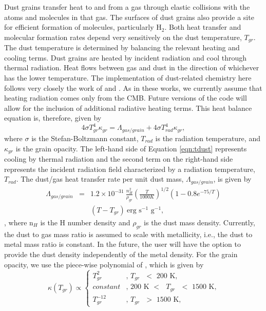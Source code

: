 Dust grains transfer heat to and from a gas through elastic collisions
with the atoms and molecules in that gas.  The surfaces of dust grains
also provide a site for efficient formation of molecules, particularly
H$_{2}$.  Both heat transfer and molecular formation rates depend very
sensitively on the dust temperature, $T_{gr}$.  The dust temperature
is determined by balancing the relevant heating and cooling terms.
Dust grains are heated by incident radiation and cool through thermal
radiation.  Heat flows between gas and dust in the direction of
whichever has the lower temperature.  The implementation of
dust-related chemistry here follows very closely the work of
\citet{2000ApJ...534..809O} and \citet{2005ApJ...626..627O}.  As in
these works, we currently assume that heating radiation comes only
from the CMB.  Future versions of the code will allow for the
inclusion of additional radiative heating terms.  This heat balance
equation is, therefore, given by
\begin{equation} \label{eqn:tdust}
4 \sigma T_{gr}^{4} \kappa_{gr} = \Lambda_{gas/grain} + 4 \sigma
T_{rad}^{4} \kappa_{gr},
\end{equation}
where $\sigma$ is the Stefan-Boltzmann constant, $T_{rad}$ is the
radiation temperature, and $\kappa_{gr}$ is the grain opacity.  The
left-hand side of Equation \ref{eqn:tdust} represents cooling by
thermal radiation and the second term on the right-hand side
represents the incident radiation field characterized by a radiation
temperature, $T_{rad}$.  The dust/gas heat transfer rate per unit dust
mass, $\Lambda_{gas/grain}$, is given by
\begin{eqnarray} \label{eqn:gasdust}
\Lambda_{gas/grain} & = & 1.2\times10^{-31}~\frac{n_{H}^{2}}{\rho_{gr}}
\left(\frac{T}{1000 K}\right)^{1/2} (1 - 0.8 e^{-75 / T})  \nonumber \\
& & (T - T_{gr})~\textrm{erg~s$^{-1}$~g$^{-1}$},
\end{eqnarray}
\citep{1989ApJ...342..306H}, where n$_{H}$ is the
H number density and $\rho_{gr}$ is the dust mass density.  Currently,
the dust to gas mass ratio is assumed to scale with metallicity, i.e.,
the dust to metal mass ratio is constant.  In the future, the user
will have the option to provide the dust density independently of the
metal density.  For the grain opacity, we use the piece-wise
polynomial of \citet{2011ApJ...729L...3D}, which is given by
\begin{equation}
\kappa(T_{gr}) \propto \left\{ \begin{array}{ll}
T_{gr}^{2} & \textrm{, $T_{gr}$ $<$ 200~K,}\\
constant & \textrm{, 200~K $<$ $T_{gr}$ $<$ 1500~K,}\\
T_{gr}^{-12} & \textrm{, $T_{gr}$ $>$ 1500~K},
\end{array} \right.
\end{equation}
